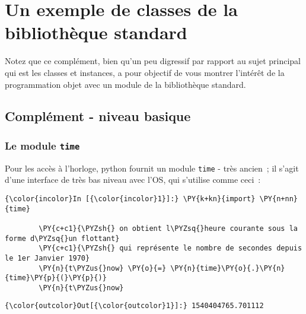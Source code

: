     
    
    
    

    

    \hypertarget{un-exemple-de-classes-de-la-bibliothuxe8que-standard}{%
\section{Un exemple de classes de la bibliothèque
standard}\label{un-exemple-de-classes-de-la-bibliothuxe8que-standard}}

    Notez que ce complément, bien qu'un peu digressif par rapport au sujet
principal qui est les classes et instances, a pour objectif de vous
montrer l'intérêt de la programmation objet avec un module de la
bibliothèque standard.

    \hypertarget{compluxe9ment---niveau-basique}{%
\subsection{Complément - niveau
basique}\label{compluxe9ment---niveau-basique}}

    \hypertarget{le-module-time}{%
\subsubsection{\texorpdfstring{Le module
\texttt{time}}{Le module time}}\label{le-module-time}}

    Pour les accès à l'horloge, python fournit un module \texttt{time} -
très ancien~; il s'agit d'une interface de très bas niveau avec l'OS,
qui s'utilise comme ceci~:

    \begin{Verbatim}[commandchars=\\\{\}]
{\color{incolor}In [{\color{incolor}1}]:} \PY{k+kn}{import} \PY{n+nn}{time}
        
        \PY{c+c1}{\PYZsh{} on obtient l\PYZsq{}heure courante sous la forme d\PYZsq{}un flottant}
        \PY{c+c1}{\PYZsh{} qui représente le nombre de secondes depuis le 1er Janvier 1970}
        \PY{n}{t\PYZus{}now} \PY{o}{=} \PY{n}{time}\PY{o}{.}\PY{n}{time}\PY{p}{(}\PY{p}{)}
        \PY{n}{t\PYZus{}now}
\end{Verbatim}


\begin{Verbatim}[commandchars=\\\{\}]
{\color{outcolor}Out[{\color{outcolor}1}]:} 1540404765.701112
\end{Verbatim}
            
